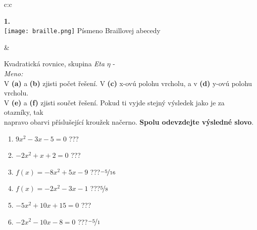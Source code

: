 \documentclass[10pt]{report}
\begin{document}
\begin{tabular}{c:c}
\begin{minipage}[c][99mm][t]{0.49\linewidth}
\begin{center}
\begin{minipage}{0.20\linewidth}
\begin{center}
{\Huge\bfseries 1.} \\[2mm]
\texttt{[image: braille.png]}
{\small Písmeno Braillovej abecedy}
\end{center}
\end{minipage}
\end{center}
\end{minipage}
&
\begin{minipage}[c][99mm][t]{0.49\linewidth}
\begin{center}
\vspace{7mm}
{\huge Kvadratická rovnice, skupina \textit{Eta $\eta$} -}\\[4.5mm]
\textit{Meno:}\phantom{xxxxxxxxxxxxxxxxxxxxxxxxxxxxxxxxxxxxxxxxxxxxxxxxxxxxxxxxxxxxxxxxx}\\[3.5mm]
V \textbf{(a)} a \textbf{(b)} zjisti počet řešení. V \textbf{(c)} x-ovú polohu vrcholu, a v \textbf{(d)} y-ovú polohu vrcholu.\\V \textbf{(e)} a \textbf{(f)} zjisti součet řešení. Pokud ti vyjde stejný výsledek jako je za otazníky, tak\\napravo obarvi příslušející kroužek načerno. \textbf{Spolu odevzdejte výsledné slovo}.\\[3mm]
\begin{minipage}{0.77\linewidth}
\begin{center}
\begin{varwidth}{\textwidth}
\begin{enumerate}
\large
\item $9x^2-3x-5=0$\quad \dotfill\; ???\;\dotfill {}
\item $-2x^2+x+2=0$\quad \dotfill\; ???\;\dotfill {}
\item $f(x)=-8x^2+5x-9$\quad \dotfill\; ???\;\dotfill \quad $\nicefrac{-5}{16}$
\item $f(x)=-2x^2-3x-1$\quad \dotfill\; ???\;\dotfill \quad $\nicefrac{5}{8}$
\item $-5x^2+10x+15=0$\quad \dotfill\; ???\;\dotfill {}
\item $-2x^2-10x-8=0$\quad \dotfill\; ???\;\dotfill \quad $\nicefrac{-5}{1}$
\end{enumerate}
\end{varwidth}
\end{center}
\end{minipage}
\begin{minipage}{0.20\linewidth}

\end{minipage}
\end{center}
\end{minipage}
\end{tabular}
\end{document}
